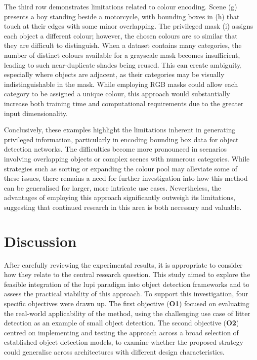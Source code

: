 The third row demonstrates limitations related to colour encoding. Scene (g) presents a boy standing beside a motorcycle, with bounding boxes in (h) that touch at their edges with some minor overlapping. The privileged mask (i) assigns each object a different colour; however, the chosen colours are so similar that they are difficult to distinguish. When a dataset contains many categories, the number of distinct colours available for a grayscale mask becomes insufficient, leading to such near-duplicate shades being reused. This can create ambiguity, especially where objects are adjacent, as their categories may be visually indistinguishable in the mask. While employing RGB masks could allow each category to be assigned a unique colour, this approach would substantially increase both training time and computational requirements due to the greater input dimensionality.


Conclusively, these examples highlight the limitations inherent in generating privileged information, particularly in encoding bounding box data for object detection networks. The difficulties become more pronounced in scenarios involving overlapping objects or complex scenes with numerous categories. While strategies such as sorting or expanding the colour pool may alleviate some of these issues, there remains a need for further investigation into how this method can be generalised for larger, more intricate use cases. Nevertheless, the advantages of employing this approach significantly outweigh its limitations, suggesting that continued research in this area is both necessary and valuable.

\section{Discussion}
\label{sec:5_discussion}

After carefully reviewing the experimental results, it is appropriate to consider how they relate to the central research question. This study aimed to explore the feasible integration of the \gls{lupi} paradigm into object detection frameworks and to assess the practical viability of this approach. To support this investigation, four specific objectives were drawn up. The first objective (\textbf{O1}) focused on evaluating the real-world applicability of the method, using the challenging use case of litter detection as an example of small object detection. The second objective (\textbf{O2}) centred on implementing and testing the approach across a broad selection of established object detection models, to examine whether the proposed strategy could generalise across architectures with different design characteristics.

